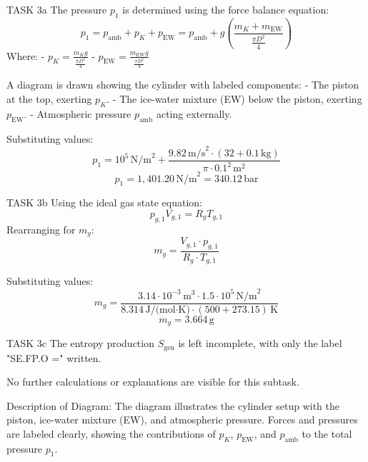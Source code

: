 TASK 3a  
The pressure \( p_1 \) is determined using the force balance equation:  
\[
p_1 = p_{\text{amb}} + p_K + p_{\text{EW}} = p_{\text{amb}} + g \left( \frac{m_K + m_{\text{EW}}}{\frac{\pi D^2}{4}} \right)
\]  
Where:  
- \( p_K = \frac{m_K g}{\frac{\pi D^2}{4}} \)  
- \( p_{\text{EW}} = \frac{m_{\text{EW}} g}{\frac{\pi D^2}{4}} \)  

A diagram is drawn showing the cylinder with labeled components:  
- The piston at the top, exerting \( p_K \).  
- The ice-water mixture (EW) below the piston, exerting \( p_{\text{EW}} \).  
- Atmospheric pressure \( p_{\text{amb}} \) acting externally.  

Substituting values:  
\[
p_1 = 10^5 \, \text{N/m}^2 + \frac{9.82 \, \text{m/s}^2 \cdot (32 + 0.1 \, \text{kg})}{\pi \cdot 0.1^2 \, \text{m}^2}
\]  
\[
p_1 = 1,401.20 \, \text{N/m}^2 = 340.12 \, \text{bar}
\]  

TASK 3b  
Using the ideal gas state equation:  
\[
p_{g,1} V_{g,1} = R_g T_{g,1}
\]  
Rearranging for \( m_g \):  
\[
m_g = \frac{V_{g,1} \cdot p_{g,1}}{R_g \cdot T_{g,1}}
\]  

Substituting values:  
\[
m_g = \frac{3.14 \cdot 10^{-3} \, \text{m}^3 \cdot 1.5 \cdot 10^5 \, \text{N/m}^2}{8.314 \, \text{J/(mol·K)} \cdot (500 + 273.15) \, \text{K}}
\]  
\[
m_g = 3.664 \, \text{g}
\]  

TASK 3c  
The entropy production \( S_{\text{gen}} \) is left incomplete, with only the label "SE.FP.O =" written.  

No further calculations or explanations are visible for this subtask.  

Description of Diagram:  
The diagram illustrates the cylinder setup with the piston, ice-water mixture (EW), and atmospheric pressure. Forces and pressures are labeled clearly, showing the contributions of \( p_K \), \( p_{\text{EW}} \), and \( p_{\text{amb}} \) to the total pressure \( p_1 \).  


